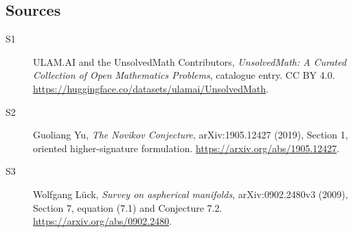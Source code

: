 \documentclass[11pt]{article}
\begin{document}
\subsection{Sources}
\begin{description}
\item[\hypertarget{source:statement:1}{S1}] ULAM.AI and the UnsolvedMath Contributors, \emph{UnsolvedMath: A Curated Collection of Open Mathematics Problems}, catalogue entry. CC BY 4.0. \url{https://huggingface.co/datasets/ulamai/UnsolvedMath}.
\item[\hypertarget{source:statement:2}{S2}] Guoliang Yu, \emph{The Novikov Conjecture}, arXiv:1905.12427 (2019), Section 1, oriented higher-signature formulation. \url{https://arxiv.org/abs/1905.12427}.
\item[\hypertarget{source:statement:3}{S3}] Wolfgang L\"uck, \emph{Survey on aspherical manifolds}, arXiv:0902.2480v3 (2009), Section 7, equation (7.1) and Conjecture 7.2. \url{https://arxiv.org/abs/0902.2480}.
\end{description}
\label{end:statement}
\end{document}
